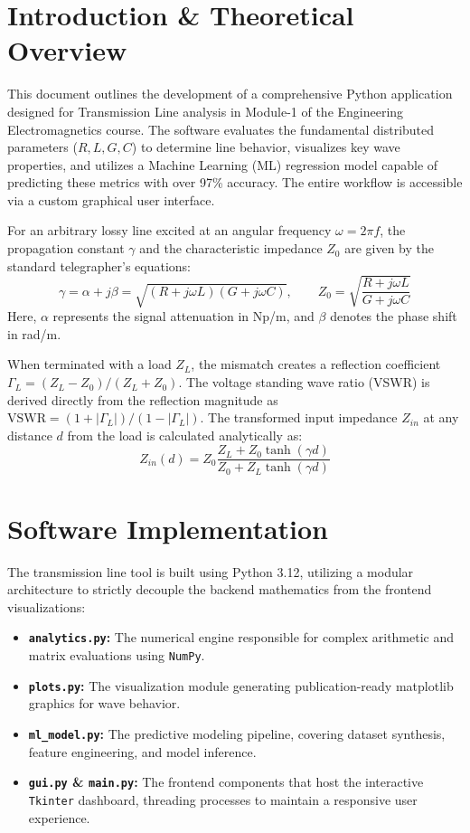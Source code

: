 \documentclass[11pt, a4paper]{article}
\begin{document}
\section{Introduction \& Theoretical Overview}
This document outlines the development of a comprehensive Python application designed for Transmission Line analysis in Module-1 of the Engineering Electromagnetics course. The software evaluates the fundamental distributed parameters ($R, L, G, C$) to determine line behavior, visualizes key wave properties, and utilizes a Machine Learning (ML) regression model capable of predicting these metrics with over 97\% accuracy. The entire workflow is accessible via a custom graphical user interface.

For an arbitrary lossy line excited at an angular frequency $\omega = 2\pi f$, the propagation constant $\gamma$ and the characteristic impedance $Z_0$ are given by the standard telegrapher's equations:
\begin{equation}
    \gamma = \alpha + j\beta = \sqrt{(R + j\omega L)(G + j\omega C)}, \qquad
    Z_0 = \sqrt{\frac{R + j\omega L}{G + j\omega C}}
\end{equation}
Here, $\alpha$ represents the signal attenuation in Np/m, and $\beta$ denotes the phase shift in rad/m.

When terminated with a load $Z_L$, the mismatch creates a reflection coefficient $\Gamma_L = (Z_L - Z_0)/(Z_L + Z_0)$. The voltage standing wave ratio (VSWR) is derived directly from the reflection magnitude as $\text{VSWR} = (1+|\Gamma_L|)/(1-|\Gamma_L|)$. The transformed input impedance $Z_{in}$ at any distance $d$ from the load is calculated analytically as:
\begin{equation}
    Z_{in}(d) = Z_0 \frac{Z_L + Z_0\tanh(\gamma d)}{Z_0 + Z_L\tanh(\gamma d)}
\end{equation}

\section{Software Implementation}
The transmission line tool is built using Python 3.12, utilizing a modular architecture to strictly decouple the backend mathematics from the frontend visualizations:
\begin{itemize}
    \item \textbf{\texttt{analytics.py}:} The numerical engine responsible for complex arithmetic and matrix evaluations using \texttt{NumPy}.
    \item \textbf{\texttt{plots.py}:} The visualization module generating publication-ready matplotlib graphics for wave behavior.
    \item \textbf{\texttt{ml\_model.py}:} The predictive modeling pipeline, covering dataset synthesis, feature engineering, and model inference.
    \item \textbf{\texttt{gui.py} \& \texttt{main.py}:} The frontend components that host the interactive \texttt{Tkinter} dashboard, threading processes to maintain a responsive user experience.
\end{itemize}
\end{document}

